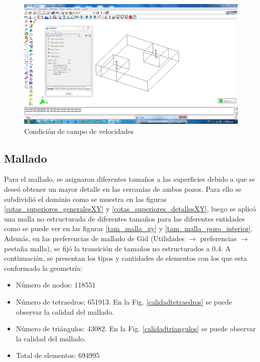 \documentclass[10pt,a4paper,final]{article}
\begin{document}
\begin{figure}[tbhp]
\centerline{\includegraphics[scale=0.75]{img/datos_condiciones_ransol_campo_de_velocidad}}
\caption{Condición de campo de velocidades}
\label{datos_condiciones_ransol_campo_de_velocidad}
\end{figure}
\subsection{Mallado}
Para el mallado, se asignaron diferentes tamaños a las superficies debido a que se deseó obtener un mayor detalle en las cercanías de ambos pozos. Para ello se subdividió el dominio como se muestra en las figuras \ref{cotas_superiores_generalesXY} y \ref{cotas_superiores_detallesXY}, luego se aplicó una malla no estructurada de diferentes tamaños para las diferentes entidades como se puede ver en las figuras \ref{tam_malla_xy} y \ref{tam_malla_pozo_interior}. Además, en las preferencias de mallado de Gid (Utilidades $\rightarrow$ preferencias $\rightarrow$ pestaña malla), se fijó la transición de tamaños no estructurados a $0.4$.
A continuación, se presentan los tipos y cantidades de elementos con los que esta conformado la geometría:
\begin{itemize}
\item Número de nodos: 118551
\item Número de tetraedros: 651913. En la Fig. \ref{calidadtetraedros} se puede observar la calidad del mallado.
\item Número de triángulos: 43082. En la Fig. \ref{calidadtriangulos} se puede observar la calidad del mallado.
\item Total de elementos: 694995
\end{itemize}
\end{document}
